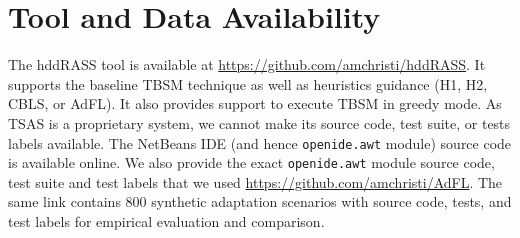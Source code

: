 \section{Tool and Data Availability}
The hddRASS tool is available at \url{https://github.com/amchristi/hddRASS}. It supports the baseline TBSM technique as well as heuristics guidance (H1, H2, CBLS, or AdFL). It also provides support to execute TBSM in greedy mode. As TSAS is a proprietary system, we cannot make its source code, test suite, or tests labels available. The NetBeans IDE (and hence \texttt{openide.awt} module) source code is available online. We also  provide the exact \texttt{openide.awt} module source code, test suite and test labels that we used \url{https://github.com/amchristi/AdFL}. The same link contains 800 synthetic adaptation scenarios with source code, tests, and test labels for empirical evaluation and comparison. 


